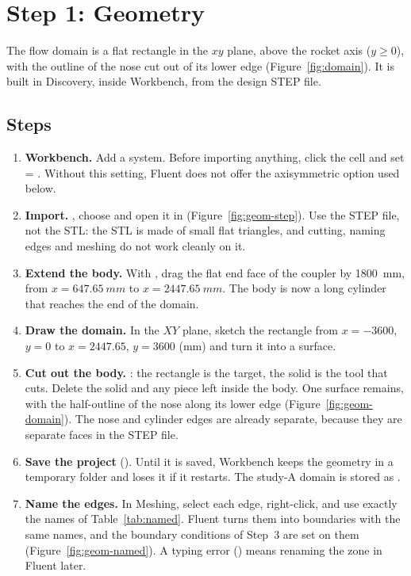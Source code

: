 \section{Step 1: Geometry}
\label{sec:geometry}

The flow domain is a flat rectangle in the $xy$ plane, above the rocket axis ($y \geq 0$), with the
outline of the nose cut out of its lower edge (Figure~\ref{fig:domain}). It is built in Discovery, inside
Workbench, from the design STEP file.

\subsection{Steps}

\begin{enumerate}
\item \textbf{Workbench.} Add a  system. Before importing anything, click the
 cell and set \then{} = . Without this setting,
Fluent does not offer the axisymmetric option used below.
\item \textbf{Import.} \then{}\then{}, choose
 and open it in 
(Figure~\ref{fig:geom-step}). Use the STEP file, not the STL: the STL is made of small flat triangles,
and cutting, naming edges and meshing do not work cleanly on it.
\item \textbf{Extend the body.} With , drag the flat end face of the coupler by
\SI{+1800}{mm}, from $x = \SI{647.65}{mm}$ to $x = \SI{2447.65}{mm}$. The body is now a long cylinder
that reaches the end of the domain.
\item \textbf{Draw the domain.} In the $XY$ plane, sketch the rectangle from $x = -3600$, $y = 0$ to
$x = 2447.65$, $y = 3600$ (mm) and turn it into a surface.
\item \textbf{Cut out the body.} \then{}: the rectangle is the
target, the solid is the tool that cuts. Delete the solid and any piece left inside the body. One
surface remains, with the half-outline of the nose along its lower edge (Figure~\ref{fig:geom-domain}).
The nose and cylinder edges are already separate, because they are separate faces in the STEP file.
\item \textbf{Save the project} (\then{}). Until it is saved, Workbench keeps the
geometry in a temporary folder and loses it if it restarts. The study-A domain is stored as
.
\item \textbf{Name the edges.} In Meshing, select each edge, right-click\then{}, and use exactly the names of Table~\ref{tab:named}. Fluent turns them into boundaries with
the same names, and the boundary conditions of Step~3 are set on them (Figure~\ref{fig:geom-named}). A
typing error () means renaming the zone in Fluent later.
\end{enumerate}

